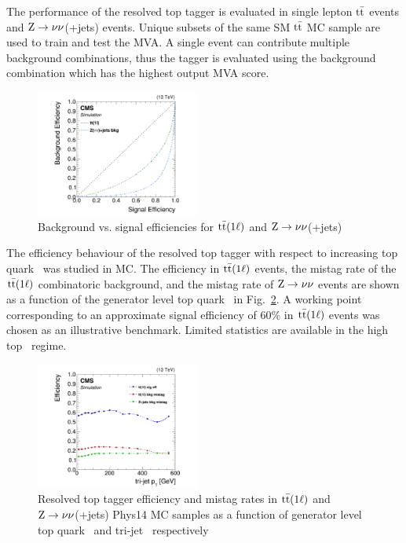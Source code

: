 The performance of the resolved top tagger is evaluated in single lepton $\mathrm{t}\bar{\mathrm{t}}$ events and $\mathrm{Z}\rightarrow\nu\nu$(+jets) events. Unique subsets of the same SM $\mathrm{t}\bar{\mathrm{t}}$ MC sample are used to train and test the MVA. A single event can contribute multiple background combinations, thus the tagger is evaluated using the background combination which has the highest output MVA score.

\begin{figure}[htbp]
	\centering
	\includegraphics[width=0.48\textwidth]{figures/roctt1lzjets.pdf}
	\caption{Background  vs. signal efficiencies for $\mathrm{t}\bar{\mathrm{t}}(1\ell)$ and $\mathrm{Z}\rightarrow\nu\nu$(+jets)}
	\label{fig:rocres}
\end{figure}

The efficiency behaviour of the resolved top tagger with respect to increasing top quark \pt\:\ was studied in MC. The efficiency in $\mathrm{t}\bar{\mathrm{t}}(1\ell)$ events, the mistag rate of the $\mathrm{t}\bar{\mathrm{t}}(1\ell)$ combinatoric background, and the mistag rate of $\mathrm{Z}\rightarrow\nu\nu$ events are shown as a function of the generator level top quark \pt\:\ in Fig.~\ref{fig:eff}. A working point corresponding to an approximate signal efficiency of 60$\%$ in $\mathrm{t}\bar{\mathrm{t}}(1\ell)$ events was chosen as an illustrative benchmark. Limited statistics are available in the high top \pt\:\ regime.

\begin{figure}
	\centering
	\includegraphics[width=0.48\textwidth]{figures/baseMVA+prob_bkg_effvspt.pdf}
	\caption{Resolved top tagger efficiency and mistag rates in $\mathrm{t}\bar{\mathrm{t}}(1\ell)$ and $\mathrm{Z}\rightarrow\nu\nu$(+jets) Phys14 MC samples as a function of generator level top quark \pt\:\ and tri-jet \pt\:\ respectively}
	\label{fig:eff}
\end{figure}

